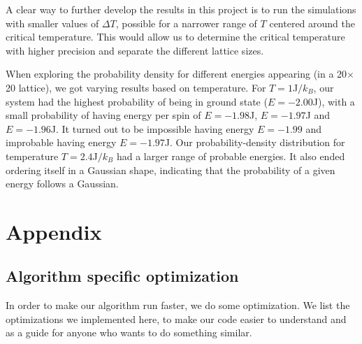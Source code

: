 \documentclass[reprint, english,notitlepage,nofootinbib]{revtex4-1}  %
\begin{document}
A clear way to further develop the results in this project is to run the simulations with smaller values of $\Delta T$, possible for a narrower range of $T$ centered around the critical temperature. This would allow us to determine the critical temperature with higher precision and separate the different lattice sizes.

When exploring the probability density for different energies appearing (in a 20$\times$20 lattice), we got varying results based on temperature. For $T=1$J$/k_B$, our system had the highest probability of being in ground state ($E = -2.00$J), with a small probability of having energy per spin of $E = -1.98$J, $E=-1.97$J and $E = -1.96$J. It turned out to be impossible having energy $E=-1.99$ and improbable having energy $E=-1.97$J. Our probability-density distribution for temperature $T=2.4$J$/k_B$ had a larger range of probable energies. It also ended ordering itself in a Gaussian shape, indicating that the probability of a given energy follows a Gaussian.


\section{Appendix}
\subsection{Algorithm specific optimization}

In order to make our algorithm run faster, we do some optimization. We list the optimizations we implemented here, to make our code easier to understand and as a guide for anyone who wants to do something similar.
\end{document}
